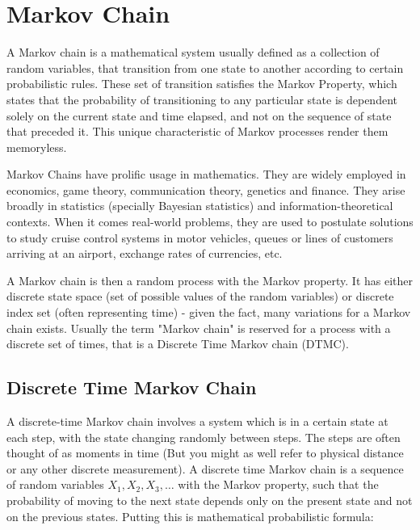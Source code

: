 \section{Markov Chain}
A Markov chain is a mathematical system usually defined as a collection of random variables, that transition from one state to another according to certain probabilistic rules. These set of transition satisfies the Markov Property, which states that the probability of transitioning to any particular state is dependent solely on the current state and time elapsed, and not on the sequence of state that preceded it. This unique characteristic of Markov processes render them memoryless.

Markov Chains have prolific usage in mathematics. They are widely employed in economics, game theory, communication theory, genetics and finance. They arise broadly in statistics (specially Bayesian statistics) and information-theoretical contexts. When it comes real-world problems, they are used to postulate solutions to study cruise control systems in motor vehicles, queues or lines of customers arriving at an airport, exchange rates of currencies, etc. 

A Markov chain is then a random process with the Markov property. It has either discrete state space (set of possible values of the random variables) or discrete index set (often representing time) - given the fact, many variations for a Markov chain exists. Usually the term "Markov chain" is reserved for a process with a discrete set of times, that is a Discrete Time Markov chain (DTMC).


\subsection{Discrete Time Markov Chain}
A discrete-time Markov chain involves a system which is in a certain state at each step, with the state changing randomly between steps. The steps are often thought of as moments in time (But you might as well refer to physical distance or any other discrete measurement). A discrete time Markov chain is a sequence of random variables $X_1, X_2, X_3,\ldots$ with the Markov property, such that the probability of moving to the next state depends only on the present state and not on the previous states. Putting this is mathematical probabilistic formula:

